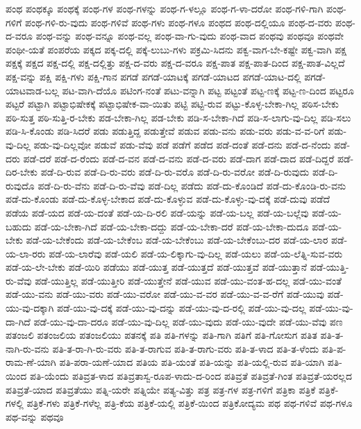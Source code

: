 {ಪಂಥ
ಪಂಥಕ್ಕೂ
ಪಂಥಕ್ಕೆ
ಪಂಥ-ಗಳ
ಪಂಥ-ಗಳನ್ನು
ಪಂಥ-ಗ-ಳಲ್ಲೂ
ಪಂಥ-ಗ-ಳಾ-ದರೋ
ಪಂಥ-ಗಳಿ-ಗಾಗಿ
ಪಂಥ-ಗಳಿಗೆ
ಪಂಥ-ಗಳಿ-ರು-ವುದು
ಪಂಥ-ಗಳಿವೆ
ಪಂಥ-ಗಳು
ಪಂಥ-ಗಳೂ
ಪಂಥದ
ಪಂಥ-ದಲ್ಲಿಯೂ
ಪಂಥ-ದ-ವರು
ಪಂಥ-ದ-ವರೂ
ಪಂಥ-ವನ್ನು
ಪಂಥ-ವನ್ನೂ
ಪಂಥ-ವಲ್ಲ
ಪಂಥ-ವಾ-ಗು-ವುದು
ಪಂಥ-ವಾದ
ಪಂಥವು
ಪಂಥವೂ
ಪಂಥವೇ
ಪಂಥೀ-ಯತೆ
ಪಂಪರೆಯ
ಪಕ್ಕದ
ಪಕ್ಕ-ದಲ್ಲಿ
ಪಕ್ಕೆ-ಲುಬು-ಗಳು
ಪಕ್ರಮಿ-ಸಿದನು
ಪಕ್ವ-ವಾಗ-ಬೇ-ಕಷ್ಟೇ
ಪಕ್ವ-ವಾಗಿ
ಪಕ್ಷ
ಪಕ್ಷಕ್ಕೆ
ಪಕ್ಷದ
ಪಕ್ಷ-ದಲ್ಲಿ
ಪಕ್ಷ-ದಲ್ಲಿತ್ತು
ಪಕ್ಷ-ದ-ವರು
ಪಕ್ಷ-ದ-ವರೂ
ಪಕ್ಷ-ಪಾತ
ಪಕ್ಷ-ಪಾತ-ದಿಂದ
ಪಕ್ಷ-ಪಾತ-ವಿಲ್ಲದೆ
ಪಕ್ಷ-ವನ್ನು
ಪಕ್ಷಿ
ಪಕ್ಷಿ-ಗಳು
ಪಕ್ಷಿ-ಗಾನ
ಪಗಡೆ
ಪಗಡೆ-ಯಾಟಕ್ಕೆ
ಪಗಡೆ-ಯಾಟದ
ಪಗಡೆ-ಯಾಟ-ದಲ್ಲಿ
ಪಗಡೆ-ಯಾಟವಾಡ-ಬಲ್ಲ
ಪಟ-ವಾಗಿ-ದೆಯೊ
ಪಟಿಂಗ-ನಂತೆ
ಪಟು-ವನ್ನಾಗಿ
ಪಟ್ಟ
ಪಟ್ಟಂತೆ
ಪಟ್ಟ-ಣಕ್ಕೆ
ಪಟ್ಟ-ಣ-ದಿಂದ
ಪಟ್ಟರೂ
ಪಟ್ಟರೆ
ಪಟ್ಟಾಗಿ
ಪಟ್ಟಾಭಿಷೇಕಕ್ಕೆ
ಪಟ್ಟಾಭಿಷೇಕ-ವಾ-ಯಿತು
ಪಟ್ಟಿ
ಪಟ್ಟಿ-ರುವ
ಪಟ್ಟು-ಕೊಳ್ಳ-ಬೇಕಾ-ಗಿಲ್ಲ
ಪಠಿಸ-ಬೇಕು
ಪಠಿ-ಸುತ್ತ
ಪಠಿ-ಸುತ್ತಿ-ರ-ಬೇಕು
ಪಡ-ಬೇಕಾ-ಗಿಲ್ಲ
ಪಡ-ಬೇಕು
ಪಡಿ-ಸ-ಬೇಕಾ-ಗಿದೆ
ಪಡಿ-ಸ-ಲಾಗು-ವು-ದಿಲ್ಲ
ಪಡಿ-ಸಲು
ಪಡಿ-ಸಿ-ಕೊಂಡು
ಪಡಿ-ಸಿದರೆ
ಪಡು
ಪಡುತ್ತಿದ್ದ
ಪಡುತ್ತೇವೆ
ಪಡುವ
ಪಡು-ವನು
ಪಡು-ವರು
ಪಡು-ವ-ವ-ರಿಗೆ
ಪಡು-ವು-ದಿಲ್ಲ
ಪಡು-ವು-ದಿಲ್ಲವೋ
ಪಡುವೆ
ಪಡು-ವೆವು
ಪಡೆ
ಪಡೆಗೆ
ಪಡೆದ
ಪಡೆ-ದಂತೆ
ಪಡೆ-ದನು
ಪಡೆ-ದ-ನೆಂದು
ಪಡೆ-ದರು
ಪಡೆ-ದರೆ
ಪಡೆ-ದ-ರೆಂದು
ಪಡೆ-ದ-ವನ
ಪಡೆ-ದ-ವನು
ಪಡೆ-ದ-ವರು
ಪಡೆ-ದಾಗ
ಪಡೆ-ದಾದ
ಪಡೆ-ದಿದ್ದರೆ
ಪಡೆ-ದಿರ-ಬೇಕು
ಪಡೆ-ದಿ-ರುವ
ಪಡೆ-ದಿ-ರು-ವರು
ಪಡೆ-ದಿ-ರು-ವರೊ
ಪಡೆ-ದಿ-ರು-ವರೋ
ಪಡೆ-ದಿ-ರುವುದು
ಪಡೆ-ದಿ-ರುವುದೊ
ಪಡೆ-ದಿ-ರು-ವೆನು
ಪಡೆ-ದಿ-ರು-ವೆವು
ಪಡೆ-ದಿಲ್ಲ
ಪಡೆದು
ಪಡೆ-ದು-ಕೊಂಡಿದೆ
ಪಡೆ-ದು-ಕೊಂಡಿ-ರು-ವನು
ಪಡೆ-ದು-ಕೊಂಡು
ಪಡೆ-ದು-ಕೊಳ್ಳ-ಬೇಕಾದ
ಪಡೆ-ದು-ಕೊಳ್ಳುವ
ಪಡೆ-ದು-ಕೊಳ್ಳು-ವು-ದಕ್ಕೆ
ಪಡೆ-ದುವು
ಪಡೆದೆ
ಪಡೆಯ
ಪಡೆ-ಯದ
ಪಡೆ-ಯ-ದಂತೆ
ಪಡೆ-ಯ-ದಿ-ರಲಿ
ಪಡೆ-ಯನ್ನು
ಪಡೆ-ಯ-ಬಲ್ಲ
ಪಡೆ-ಯ-ಬಲ್ಲೆವು
ಪಡೆ-ಯ-ಬಹುದು
ಪಡೆ-ಯ-ಬೇಕಾ-ಗಿದೆ
ಪಡೆ-ಯ-ಬೇಕಾ-ದದ್ದು
ಪಡೆ-ಯ-ಬೇಕಾ-ದರೆ
ಪಡೆ-ಯ-ಬೇಕಾ-ದುದೂ
ಪಡೆ-ಯ-ಬೇಕು
ಪಡೆ-ಯ-ಬೇಕೆಂದು
ಪಡೆ-ಯ-ಬೇಕೆಂಬ
ಪಡೆ-ಯ-ಬೇಕೆಂಬು
ಪಡೆ-ಯ-ಬೇಕೆಂಬು-ದರ
ಪಡೆ-ಯ-ಲಾರ
ಪಡೆ-ಯ-ಲಾ-ರರು
ಪಡೆ-ಯ-ಲಾರೆವು
ಪಡೆ-ಯಲಿ
ಪಡೆ-ಯ-ಲಿಕ್ಕಾಗು-ವು-ದಿಲ್ಲ
ಪಡೆ-ಯಲು
ಪಡೆ-ಯ-ಲೆತ್ನಿ-ಸುವ-ವರು
ಪಡೆ-ಯ-ಲೇ-ಬೇಕು
ಪಡೆ-ಯಿರಿ
ಪಡೆಯು
ಪಡೆ-ಯುತ್ತ
ಪಡೆ-ಯುತ್ತದೆ
ಪಡೆ-ಯುತ್ತವೆ
ಪಡೆ-ಯುತ್ತಾನೆ
ಪಡೆ-ಯುತ್ತಿ-ರು-ವೆವು
ಪಡೆ-ಯುತ್ತಿಲ್ಲ
ಪಡೆ-ಯುತ್ತೀರಿ
ಪಡೆ-ಯುತ್ತೇನೆ
ಪಡೆ-ಯುವ
ಪಡೆ-ಯು-ವಂತ-ಹ-ದಲ್ಲ
ಪಡೆ-ಯು-ವಂತೆ
ಪಡೆ-ಯು-ವನು
ಪಡೆ-ಯು-ವರು
ಪಡೆ-ಯು-ವರೋ
ಪಡೆ-ಯು-ವ-ವರ
ಪಡೆ-ಯು-ವ-ವ-ರೆಗೆ
ಪಡೆ-ಯುವು
ಪಡೆ-ಯು-ವು-ದಕ್ಕಾಗಿ
ಪಡೆ-ಯು-ವು-ದಕ್ಕೆ
ಪಡೆ-ಯು-ವು-ದನ್ನು
ಪಡೆ-ಯು-ವು-ದ-ರಲ್ಲಿ
ಪಡೆ-ಯು-ವು-ದಲ್ಲ
ಪಡೆ-ಯು-ವು-ದಾ-ಗಿದೆ
ಪಡೆ-ಯು-ವು-ದಾ-ದರೂ
ಪಡೆ-ಯು-ವು-ದಿಲ್ಲ
ಪಡೆ-ಯು-ವುದು
ಪಡೆ-ಯು-ವುದೇ
ಪಡೆ-ಯು-ವೆವು
ಪಣ
ಪತಂಜಲಿ
ಪತಂಜಲಿಯ
ಪತಂಜಲಿಯು
ಪತನಕ್ಕೆ
ಪತಿ
ಪತಿ-ಗಳನ್ನು
ಪತಿ-ಗಾಗಿ
ಪತಿಗೆ
ಪತಿ-ಗೋಸುಗ
ಪತಿತ
ಪತಿ-ತ-ನಾಗಿ-ರು-ವನು
ಪತಿ-ತ-ರಾ-ಗಿ-ರು-ವರು
ಪತಿ-ತ-ರಾಗುವ
ಪತಿ-ತ-ರಾಗು-ವರು
ಪತಿ-ತ-ಳಾದ
ಪತಿ-ತ-ಳೆಂದು
ಪತಿ-ಪ-ರಾಮ-ಣೆ-ಯಾಗಿ
ಪತಿ-ಪರಾ-ಯಣೆ-ಯಾದ
ಪತಿಯ
ಪತಿ-ಯಂತೆ
ಪತಿ-ಯನ್ನು
ಪತಿ-ಯಲ್ಲಿ-ರುವ
ಪತಿ-ಯಾಗಿ
ಪತಿ-ಯಿಂದ
ಪತಿ-ಯೆಂದು
ಪತಿವ್ರತ-ಳಾದ
ಪತಿವ್ರತಾಸ್ವ-ರೂಪ-ಳಾದು-ದ-ರಿಂದ
ಪತಿವ್ರತೆ
ಪತಿವ್ರತೆ-ಗಿಂತ
ಪತಿವ್ರತೆ-ಯರಲ್ಲದ
ಪತಿವ್ರತೆ-ಯಾದ
ಪತಿವ್ರತೆಯು
ಪತ್ನಿ-ಯರೇ
ಪತ್ನಿಯೇ
ಪತ್ಯ-ವಿತ್ತು
ಪತ್ರ
ಪತ್ರ-ಗಳ
ಪತ್ರ-ಗಳಿಗೆ
ಪತ್ರಿಕಾ
ಪತ್ರಿಕೆ
ಪತ್ರಿಕೆ-ಗಳಲ್ಲಿ
ಪತ್ರಿಕೆ-ಗಳು
ಪತ್ರಿಕೆ-ಗಳೆಲ್ಲ
ಪತ್ರಿ-ಕೆಯ
ಪತ್ರಿಕೆ-ಯಲ್ಲಿ
ಪತ್ರಿಕೆ-ಯಿಂದ
ಪತ್ರಿಕೋದ್ಯಮ
ಪಥ
ಪಥ-ಗಳಿವೆ
ಪಥ-ಗಳೂ
ಪಥ-ವನ್ನು
ಪಥವೂ
}
